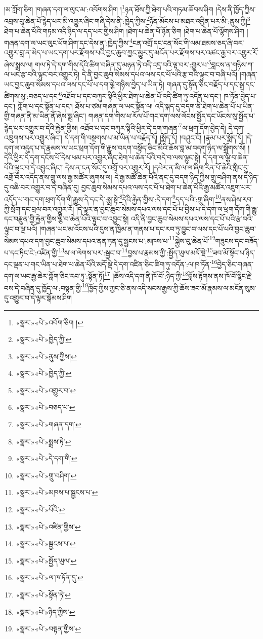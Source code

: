 །མ་ཀློག་ཅིག །གཞན་དག་ལ་ལུང་མ་:འབོགས་ཤིག །\footnote{«སྣར་»«པེ་»འབོག་ཅིག །}ཉན་ཐོས་ཀྱི་ཐེག་པའི་གཏམ་ཆོབས་ཤིག །དེས་ནི་ཁྱོད་ཀྱིས་འབྲས་བུ་ཆེན་པོ་རྙེད་པར་མི་འགྱུར་ཞིང་གཞི་དེས་ནི་:ཁྱེད་ཀྱིས་\footnote{«སྣར་»«པེ་»ཁྱེད་ཀྱི་}ཉོན་མོངས་པ་མཐར་འབྱིན་པར་མི་:ནུས་ཀྱི།\footnote{«སྣར་»«པེ་»ནུས་ཀྱིས།} ཐེག་པ་ཆེན་པོའི་གཏམ་འདི་ཉིད་ལ་དད་པར་གྱིས་ཤིག །ཐེག་པ་ཆེན་པོ་ཉོན་ཅིག །ཐེག་པ་ཆེན་པོ་ལྷོགས་ཤིག །གཞན་དག་ལ་ཡང་ལུང་ཕོག་ཤིག་དང་དེས་ན་:ཁྱེད་ཀྱིས་\footnote{«སྣར་»«པེ་»ཁྱེད་ཀྱི་}ངན་འགྲོ་དང་ངན་སོང་གི་ལམ་ཐམས་ཅད་ཞི་བར་འགྱུར་བླ་ན་མེད་པ་ཡང་དག་པར་རྫོགས་པའི་བྱང་ཆུབ་ཀྱང་མྱུར་དུ་མངོན་པར་རྫོགས་པར་འཚང་རྒྱ་བར་འགྱུར་རོ་ཞེས་སྨྲས་ལ། གལ་ཏེ་དེ་དག་གིས་དེའི་ཚིག་བཞིན་དུ་མཉན་ཏེ་འདི་འདྲ་བའི་ལྟ་བར་:གྱུར་པ་\footnote{«སྣར་»«པེ་»འགྱུར་བ་}བླངས་ན་གཉིས་ཀ་ལ་ཡང་རྩ་བའི་ལྟུང་བར་འགྱུར་ཏེ། དེ་ནི་བྱང་ཆུབ་སེམས་དཔའ་ལས་དང་པོ་པའི་རྩ་བའི་ལྟུང་བ་བཞི་པའོ། །གཞན་ཡང་བྱང་ཆུབ་སེམས་དཔའ་ལས་དང་པོ་པ་དག་ལྕེ་གཉིས་བྱེད་པ་ཡིན་ཏེ། གཞན་དུ་སྟོན་ཅིང་བརྗོད་པ་དང་སྒྲ་དང་ཚིགས་སུ་:བཅད་པ་དང་\footnote{«སྣར་»«པེ་»བཅད་པ་}འཐོབ་པ་དང་བཀུར་སྟིའི་ཕྱིར་ཐེག་པ་ཆེན་པོ་འདི་ཚིག་ཏུ་འདོན་པ་དང་། ཁ་ཏོན་བྱེད་པ་དང་། ཀློག་པ་དང་སྟོན་པ་དང་། ཐོས་པ་ཙམ་གཞན་ལ་ཡང་སྟོན་ལ། འདི་སྐད་དུ་བདག་ནི་ཐེག་པ་ཆེན་པོ་པ་ཡིན་གྱི་གཞན་ནི་མ་ཡིན་ནོ་ཞེས་སྨྲ་ཞིང་། གཞན་དག་གིས་ཕ་རོལ་པོ་གང་དག་ལས་ལོངས་སྤྱོད་དང་ཡོངས་སུ་སྤྱོད་པ་རྙེད་པར་འགྱུར་བ་དེའི་རྐྱེན་གྱིས། འཐོབ་པ་དང་བཀུར་སྟིའི་ཕྱིར་དེ་དག་གཞན་\footnote{«སྣར་»«པེ་»གཞན་དག་}ལ་ཕྲག་དོག་བྱེད་དེ། དེ་དག་འཁྲུགས་པར་འགྱུར་ཞིང་། དེ་དག་གི་བསྔགས་པ་མ་ཡིན་པ་བརྗོད་དོ། །སྨོད་དོ། །བཤུང་ངོ། །རྣམ་པར་སྨོད་དོ། །དེ་དག་ལ་འདུད་པ་དེ་རྣམས་ལ་ཡང་ཕྲག་དོག་གི་རྒྱུས་བདག་བསྟོད་ཅིང་མིའི་ཆོས་བླ་མ་བདག་ཉིད་ལ་སྒྲོགས་སོ། །དེའི་ཕྱིར་དེ་དག་དངོས་པོ་དེས་ཕམ་པར་འགྱུར་ཞིང་ཐེག་པ་ཆེན་པོའི་བདེ་བ་ལས་ལྷུང་སྟེ། དེ་དག་ལ་ལྕི་བ་ཆེན་པོའི་ལྟུང་བ་དེ་འབྱུང་ཞིང་། དེས་ན་ངན་སོང་དུ་འགྲོ་བར་འགྱུར་རོ། །དཔེར་ན་མི་ལ་ལ་ཞིག་རིན་པོ་ཆེའི་གླིང་དུ་འགྲོ་བར་འདོད་ནས་གྲུ་ལས་རྒྱ་མཚོར་ཞུགས་ལ། དེ་རྒྱ་མཚོ་ཆེན་པོའི་ནང་དུ་བདག་ཉིད་ཀྱིས་གྲུ་བཤིག་ནས་དེ་ཉིད་དུ་འཆི་བར་འགྱུར་བ་དེ་བཞིན་དུ། བྱང་ཆུབ་སེམས་དཔའ་ལས་དང་པོ་པ་ཐེག་པ་ཆེན་པོའི་རྒྱ་མཚོར་འཇུག་པར་འདོད་པ་གང་དག་ཕྲག་དོག་གི་རྒྱུས་དེ་དང་དེ་:སྨྲ་སྟེ་\footnote{«སྣར་»«པེ་»སྨྲས་ཏེ་}དེའི་རྐྱེན་གྱིས་:དེ་དག་\footnote{«སྣར་»«པེ་»དེ་དག་གི་}དད་པའི་:གྲུ་ཞིག་\footnote{«སྣར་»«པེ་»གྲུ་བཤིག་}ནས་ཤེས་རབ་ཀྱི་སྲོག་དང་བྲལ་བར་འགྱུར་རོ། །དེ་ལྟར་ན་བྱང་ཆུབ་སེམས་དཔའ་ལས་དང་པོ་པ་བྱིས་པ་དེ་དག་ལ་ཕྲག་དོག་གི་རྒྱུ་དང་བརྫུན་གྱི་རྐྱེན་གྱིས་ལྕི་བ་ཆེན་པོའི་ལྟུང་བ་འབྱུང་སྟེ། འདི་ནི་བྱང་ཆུབ་སེམས་དཔའ་ལས་དང་པོ་པའི་རྩ་བའི་ལྟུང་བ་ལྔ་པའོ། །གཞན་ཡང་མ་འོངས་པའི་དུས་ན་ཁྱིམ་ན་གནས་པ་དང་རབ་ཏུ་བྱུང་བ་ལས་དང་པོ་པའི་བྱང་ཆུབ་སེམས་དཔའ་དག་བྱང་ཆུབ་སེམས་དཔའ་ནན་ཏན་དུ་སྦྱངས་པ་:མཁས་པ་\footnote{«སྣར་»«པེ་»མཁས་པ་སྦྱངས་པ་}སྐྱེས་བུ་ཆེན་པོ་\footnote{«སྣར་»«པེ་»པོའི་}གཟུངས་དང་བཟོད་པ་དང་ཏིང་ངེ་:འཛིན་གྱི་\footnote{«སྣར་»«པེ་»འཛིན་གྱིས་}ས་ལ་ལེགས་པར་:སྦྱང་བ་\footnote{«སྣར་»«པེ་»སྦྱངས་པ་}བྱས་པ་རྣམས་ཀྱི་:སྤྱོད་ཡུལ་མདོ་སྡེ་\footnote{«སྣར་»«པེ་»སྤྱོད་ཡུལ་}ཟབ་མོ་སྟོང་པ་ཉིད་དང་ལྡན་པ་གང་ཡིན་པ་ཐེག་པ་ཆེན་པོའི་མདོ་སྡེ་དེ་དག་འཛིན་ཅིང་ཚིག་ཏུ་འདོན་:ལ་ཁ་ཏོན་\footnote{«སྣར་»«པེ་»ལ་ཁ་ཏོན་དུ་}བྱེད་ཅིང་གཞན་དག་ལ་ཡང་རྒྱ་ཆེར་ཀློག་ཅིང་རབ་ཏུ་:སྟོན་ཏོ།\footnote{«སྣར་»«པེ་»སྟོན་ཏེ།} །ཆོས་འདི་དག་ནི་ཁོ་བོ་:ཉིད་ཀྱི་\footnote{«སྣར་»«པེ་»ཉིད་ཀྱིས་}བློས་རྟོགས་ནས་ཁོ་བོ་སྙིང་རྗེ་བས་དེ་བཞིན་དུ་ཁྱོད་ལ་:བསྟན་གྱི་\footnote{«སྣར་»«པེ་»བསྟན་གྱིས་}ཁྱོད་ཀྱིས་ཀྱང་ཅི་ནས་འདི་སངས་རྒྱས་ཀྱི་ཆོས་ཟབ་མོ་རྣམས་ལ་མངོན་སུམ་དུ་འགྱུར་བ་དེ་ལྟར་སྒོམས་ཤིག 